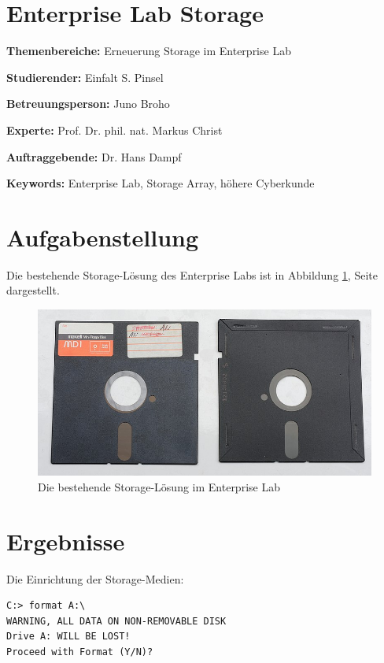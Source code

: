 \documentclass[a4paper,10pt,hidelinks]{scrartcl}
\newcommand{\imgref}[1]{{Abbildung \ref{#1}, Seite \pageref{#1}}}
\begin{document}
\section*{\fontsize{18}{20}\selectfont Enterprise Lab Storage}
\thispagestyle{firstpage}

\textbf{Themenbereiche:} \tabto{4cm} Erneuerung Storage im Enterprise Lab

\noindent
\textbf{Studierender:} \tabto{4cm} Einfalt S. Pinsel

\noindent
\textbf{Betreuungsperson:} \tabto{4cm} Juno Broho

\noindent
\textbf{Experte:} \tabto{4cm} Prof. Dr. phil. nat. Markus Christ

\noindent
\textbf{Auftraggebende:} \tabto{4cm} Dr. Hans Dampf

\noindent
\textbf{Keywords:} \tabto{4cm} Enterprise Lab, Storage Array, höhere Cyberkunde

\section{\fontsize{14}{16}\selectfont Aufgabenstellung}

\Blindtext

Die bestehende Storage-Lösung des Enterprise Labs ist in \imgref{fig:storage-old} dargestellt.

\begin{figure}
    \centering
    \includegraphics[width=0.5\linewidth]{pics/storage-old.jpg}
    \caption{Die bestehende Storage-Lösung im Enterprise Lab}
    \label{fig:storage-old}
\end{figure}

\section{\fontsize{14}{16}\selectfont Ergebnisse}

\blindtext

Die Einrichtung der Storage-Medien:

\begin{lstlisting}
C:> format A:\
WARNING, ALL DATA ON NON-REMOVABLE DISK
Drive A: WILL BE LOST!
Proceed with Format (Y/N)?
\end{lstlisting}
\end{document}
